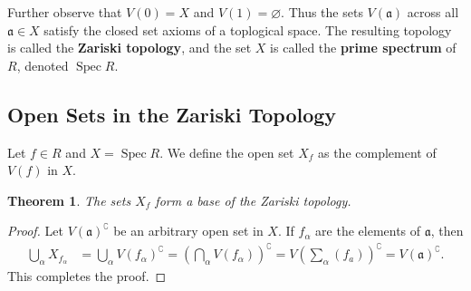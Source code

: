 \documentclass[11pt]{article}
\newtheorem{theorem}{Theorem}
\newcommand{\Spec}{\operatorname{Spec}}
\begin{document}
Further observe that $V(0) = X$ and $V(1) = \varnothing$. Thus the sets $V(\mathfrak{a})$ across all $\mathfrak{a} \in X$ satisfy the closed set axioms of a toplogical space. The resulting topology is called the \textbf{Zariski topology}, and the set $X$ is called the \textbf{prime spectrum} of $R$, denoted $\Spec R$.


\subsection{Open Sets in the Zariski Topology}

Let $f \in R$ and $X = \Spec R$. We define the open set $X_{f}$ as the complement of $V(f)$ in $X$.

\begin{adjustwidth}{0.5cm}{}
  \begin{theorem}
    The sets $X_{f}$ form a base of the Zariski topology.
  \end{theorem}
  \begin{proof}
    Let $V(\mathfrak{a})^{\complement}$ be an arbitrary open set in $X$. If $f_{\alpha}$ are the elements of $\mathfrak{a}$, then
    \begin{align*}
      \bigcup\limits_{\alpha} X_{f_{\alpha}} &= \bigcup\limits_{\alpha} V(f_{\alpha})^{\complement} = \left( \bigcap\limits_{\alpha} V(f_{\alpha}) \right)^{\complement} = V \left( \sum\limits_{\alpha} (f_{a})  \right)^{\complement} = V(\mathfrak{a})^{\complement}.
    \end{align*}
    This completes the proof.
  \end{proof} 
\end{adjustwidth}
\end{document}
